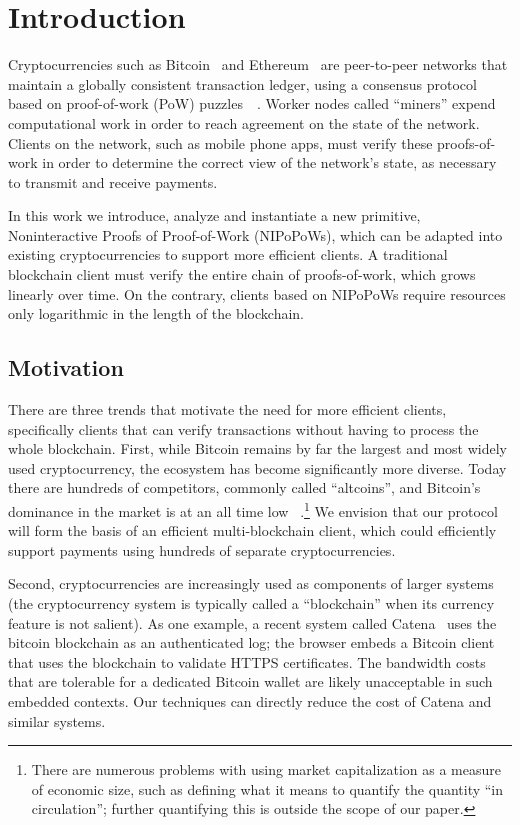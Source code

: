 \section{Introduction}

Cryptocurrencies such as Bitcoin~\cite{bitcoin}\cite{bitcoinsoftware} and
Ethereum~\cite{ethereum} are
peer-to-peer networks that maintain a globally consistent transaction ledger,
using a consensus protocol based on proof-of-work (PoW)
puzzles~\cite{pow}~\cite{hashcash}. Worker nodes called ``miners'' expend
computational work in order to reach agreement on the state of the network.
Clients on the network, such as mobile phone apps, must verify these
proofs-of-work in order to determine the correct view of the network's state, as
necessary to transmit and receive payments.

In this work we introduce, analyze and instantiate a new primitive,
Noninteractive Proofs of Proof-of-Work (NIPoPoWs), which can be adapted into
existing cryptocurrencies to support more efficient clients. A traditional
blockchain client must verify the entire chain of proofs-of-work, which grows
linearly over time. On the contrary, clients based on NIPoPoWs require resources
only logarithmic in the length of the blockchain.

\subsection{Motivation}

There are three trends that motivate the need for more efficient clients,
specifically clients that can verify transactions without having to process the
whole blockchain. First, while Bitcoin remains by far the largest and most
widely used cryptocurrency, the ecosystem has become significantly more diverse.
Today there are hundreds of competitors, commonly called ``altcoins'', and
Bitcoin's dominance in the market is at an all time low
~\cite{marketcap}.\footnote{There are numerous problems with using  market
capitalization as a measure of economic size, such as defining what it means to
quantify the quantity ``in circulation''; further quantifying this is outside
the scope of our paper.} We envision that our protocol will form the basis of an
efficient multi-blockchain client, which could efficiently support payments
using hundreds of separate cryptocurrencies.

Second, cryptocurrencies are increasingly used as components of larger systems
(the cryptocurrency system is typically called a ``blockchain'' when its
currency feature is not salient). As one example, a recent system called
Catena~\cite{catena} uses the bitcoin blockchain as an authenticated log; the
browser embeds a Bitcoin client that uses the blockchain to validate HTTPS
certificates. The bandwidth costs that are tolerable for a dedicated Bitcoin
wallet are likely unacceptable in such embedded contexts. Our techniques can
directly reduce the cost of Catena and similar systems.

